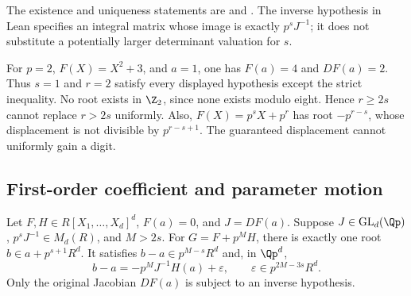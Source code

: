 The existence and uniqueness statements are
 and
.
The inverse hypothesis in Lean specifies an integral matrix whose image
is exactly $p^sJ^{-1}$; it does not substitute a potentially larger
determinant valuation for $s$.

\begin{example}
\label{ex:weighted-boundary}
For $p=2$, $F(X)=X^2+3$, and $a=1$, one has $F(a)=4$ and $DF(a)=2$.
Thus $s=1$ and $r=2$ satisfy every displayed hypothesis except the strict
inequality. No root exists in $\Z_2$, since none exists modulo eight.
Hence $r\ge2s$ cannot replace $r>2s$ uniformly. Also,
$F(X)=p^sX+p^r$ has root $-p^{r-s}$, whose displacement is not divisible
by $p^{r-s+1}$. The guaranteed displacement cannot uniformly gain a digit.
\end{example}

\subsection{First-order coefficient and parameter motion}

\begin{theorem}\label{thm:coefficient-motion}
Let $F,H\in R[X_1,\ldots,X_d]^d$, $F(a)=0$, and $J=DF(a)$. Suppose
$J\in\operatorname{GL}_d(\Qp)$, $p^sJ^{-1}\in M_d(R)$, and $M>2s$.
For $G=F+p^MH$, there is exactly one root $b\in a+p^{s+1}R^d$.
It satisfies $b-a\in p^{M-s}R^d$ and, in $\Qp^d$,
\begin{equation}\label{eq:coefficient-first-order}
 b-a=-p^MJ^{-1}H(a)+\varepsilon,
 \qquad\varepsilon\in p^{2M-3s}R^d.
\end{equation}
Only the original Jacobian $DF(a)$ is subject to an inverse hypothesis.
\end{theorem}

